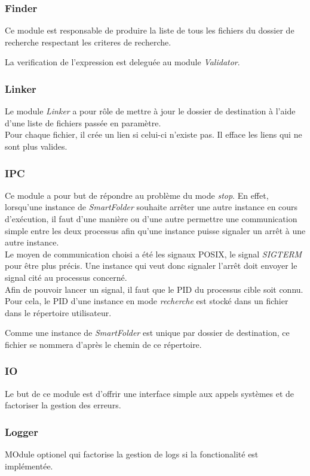 \documentclass[11pt, a4paper]{article}
\begin{document}
\subsubsection{Finder}
Ce module est responsable de produire la liste de tous les fichiers du dossier de recherche respectant les criteres de recherche.

La verification de l'expression est deleguée au module \textit{Validator}.

\subsubsection{Linker}
Le module \textit{Linker} a pour rôle de mettre à jour le dossier de destination
à l'aide d'une liste de fichiers passée en paramètre. \\

Pour chaque fichier, il crée un lien si celui-ci n'existe pas. Il efface les liens qui ne sont plus valides.

\subsubsection{IPC}
\label{sec:ipc}
Ce module a pour but de répondre au problème du mode \textit{stop}.
En effet, lorsqu'une instance de \textit{SmartFolder} souhaite arrêter une autre instance en cours d'exécution,
il faut d'une manière ou d'une autre permettre une communication simple entre les deux processus afin
qu'une instance puisse signaler un arrêt à une autre instance. \\

Le moyen de communication choisi a été les signaux POSIX, le signal \textit{SIGTERM} pour être plus précis.
Une instance qui veut donc signaler l'arrêt doit envoyer le signal cité au processus concerné. \\

Afin de pouvoir lancer un signal, il faut que le PID du processus cible soit connu.
Pour cela, le PID d'une instance en mode \textit{recherche} est stocké dans un fichier
dans le répertoire utilisateur.

Comme une instance de \textit{SmartFolder} est unique par dossier de destination,
ce fichier se nommera d'après le chemin de ce répertoire.

\subsubsection{IO}
Le but de ce module est d'offrir une interface simple aux appels systèmes et de factoriser la gestion des erreurs.

\subsubsection{Logger}
MOdule optionel qui factorise la gestion de logs si la fonctionalité est implémentée.
\end{document}
